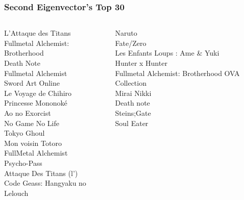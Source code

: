 \documentclass[handout]{beamer}
\begin{document}
\begin{frame}
    \frametitle{Second Eigenvector's Top 30}
    \begin{columns}
    \begin{column}{0.5\textwidth}
                                L'Attaque des Titans\\
                    Fullmetal Alchemist: Brotherhood\\
                                          Death Note\\
                                 Fullmetal Alchemist\\
                                    Sword Art Online\\
                                Le Voyage de Chihiro\\
                                  Princesse Mononoké\\
                                      Ao no Exorcist\\
                                     No Game No Life\\
                                         Tokyo Ghoul\\
                                   Mon voisin Totoro\\
                                 FullMetal Alchemist\\
                                         Psycho-Pass\\
                             Attaque Des Titans (l')\\
                     Code Geass: Hangyaku no Lelouch\\
    \end{column}
    \begin{column}{0.5\textwidth}
                                              Naruto\\
                                           Fate/Zero\\
                      Les Enfants Loups : Ame \& Yuki\\
                                     Hunter x Hunter\\
     Fullmetal Alchemist: Brotherhood OVA Collection\\
                                         Mirai Nikki\\
                                          Death note\\
                                         Steins\string;Gate\\
                                          Soul Eater\\

\end{column}
\end{columns}
\end{frame}
\end{document}
